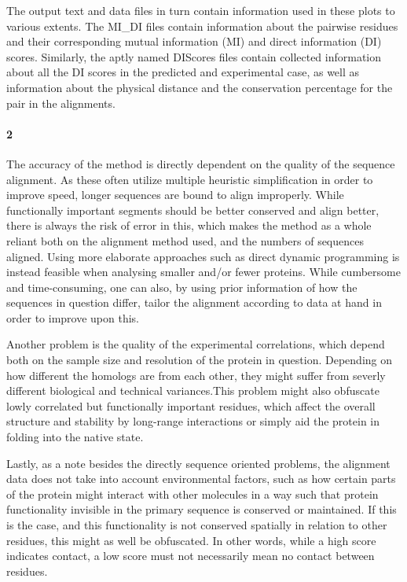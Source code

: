 \documentclass[11pt]{article}\usepackage[]{graphicx}\usepackage[]{color}
\theoremstyle{plain}
\begin{document}
\begin{multicols*}{2}
	The output text and data files in turn contain information used in these plots to various extents. The MI\_DI files contain information about the pairwise residues and their corresponding mutual information (MI) and direct information (DI) scores. Similarly, the aptly named DIScores files contain collected information about all the DI scores in the predicted and experimental case, as well as information about the physical distance and the conservation percentage for the pair in the alignments.
	
	\paragraph{2}
	The accuracy of the method is directly dependent on the quality of the sequence alignment. As these often utilize multiple heuristic simplification in order to improve speed, longer sequences are bound to align improperly. While functionally important segments should be better conserved and align better, there is always the risk of error in this, which makes the method as a whole reliant both on the alignment method used, and the numbers of sequences aligned. Using more elaborate approaches such as direct dynamic programming is instead feasible when analysing smaller and/or fewer proteins. While cumbersome and time-consuming, one can also, by using prior information of how the sequences in question differ, tailor the alignment according to data at hand in order to improve upon this. 
	
	Another problem is the quality of the experimental correlations, which depend both on the sample size and resolution of the protein in question. Depending on how different the homologs are from each other, they might suffer from severly different biological and technical variances.This problem might also obfuscate lowly correlated but functionally important residues, which affect the overall structure and stability by long-range interactions or simply aid the protein in folding into the native state. 
	
	Lastly, as a note besides the directly sequence oriented problems, the alignment data does not take into account environmental factors, such as how certain parts of the protein might interact with other molecules in a way such that protein functionality invisible in the primary sequence is conserved or maintained. If this is the case, and this functionality is not conserved spatially in relation to other residues, this might as well be obfuscated. In other words, while a high score indicates contact, a low score must not necessarily mean no contact between residues.
	

\end{multicols*}
\end{document}
